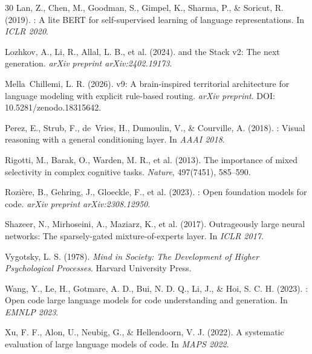 \documentclass[11pt,a4paper]{article}
\begin{document}
\begin{thebibliography}{30}
Lan, Z., Chen, M., Goodman, S., Gimpel, K., Sharma, P., \& Soricut, R. (2019).
: A lite {BERT} for self-supervised learning of language
representations.
\newblock In \emph{ICLR 2020}.

Lozhkov, A., Li, R., Allal, L. B., et al. (2024).
 and the {Stack v2}: The next generation.
\newblock \emph{arXiv preprint arXiv:2402.19173}.

Mella~Chillemi, L. R. (2026).
 v9: A brain-inspired territorial architecture for
language modeling with explicit rule-based routing.
\newblock \emph{arXiv preprint}. DOI: 10.5281/zenodo.18315642.

Perez, E., Strub, F., de~Vries, H., Dumoulin, V., \& Courville, A. (2018).
: Visual reasoning with a general conditioning layer.
\newblock In \emph{AAAI 2018}.

Rigotti, M., Barak, O., Warden, M. R., et al. (2013).
\newblock The importance of mixed selectivity in complex cognitive tasks.
\newblock \emph{Nature}, 497(7451), 585--590.

Rozi\`{e}re, B., Gehring, J., Gloeckle, F., et al. (2023).
: Open foundation models for code.
\newblock \emph{arXiv preprint arXiv:2308.12950}.

Shazeer, N., Mirhoseini, A., Maziarz, K., et al. (2017).
\newblock Outrageously large neural networks: The sparsely-gated
mixture-of-experts layer.
\newblock In \emph{ICLR 2017}.

Vygotsky, L. S. (1978).
\newblock \emph{Mind in Society: The Development of Higher Psychological
Processes}.
\newblock Harvard University Press.

Wang, Y., Le, H., Gotmare, A. D., Bui, N. D. Q., Li, J., \& Hoi, S. C. H.
(2023).
: Open code large language models for code understanding
and generation.
\newblock In \emph{EMNLP 2023}.

Xu, F. F., Alon, U., Neubig, G., \& Hellendoorn, V. J. (2022).
\newblock A systematic evaluation of large language models of code.
\newblock In \emph{MAPS 2022}.

\end{thebibliography}
\end{document}
